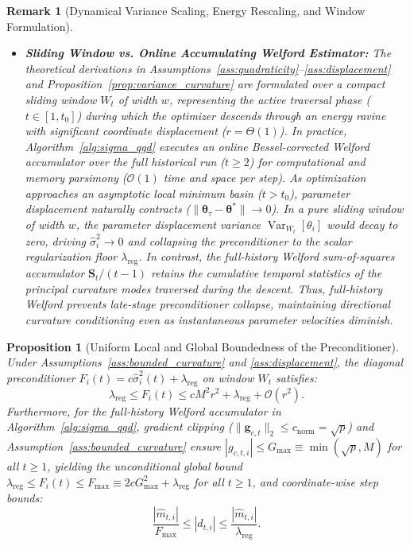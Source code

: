 \documentclass[11pt,a4paper]{article}
\newtheorem{proposition}{Proposition}
\newtheorem{remark}{Remark}
\begin{document}
\begin{remark}[Dynamical Variance Scaling, Energy Rescaling, and Window Formulation]
\begin{itemize}
    \item \textbf{Sliding Window vs. Online Accumulating Welford Estimator:} The theoretical derivations in Assumptions~\ref{ass:quadraticity}--\ref{ass:displacement} and Proposition~\ref{prop:variance_curvature} are formulated over a compact sliding window $W_t$ of width $w$, representing the active traversal phase ($t \in [1, t_0]$) during which the optimizer descends through an energy ravine with significant coordinate displacement ($r = \Theta(1)$). In practice, Algorithm~\ref{alg:sigma_qgd} executes an online Bessel-corrected Welford accumulator over the full historical run ($t \ge 2$) for computational and memory parsimony ($\mathcal{O}(1)$ time and space per step). As optimization approaches an asymptotic local minimum basin ($t > t_0$), parameter displacement naturally contracts ($\|\boldsymbol{\theta}_\tau - \boldsymbol{\theta}^*\| \to 0$). In a pure sliding window of width $w$, the parameter displacement variance $\operatorname{Var}_{W_t}[\theta_i]$ would decay to zero, driving $\hat{\sigma}_i^2 \to 0$ and collapsing the preconditioner to the scalar regularization floor $\lambda_{\text{reg}}$. In contrast, the full-history Welford sum-of-squares accumulator $\mathbf{S}_t / (t-1)$ retains the cumulative temporal statistics of the principal curvature modes traversed during the descent. Thus, full-history Welford prevents late-stage preconditioner collapse, maintaining directional curvature conditioning even as instantaneous parameter velocities diminish.
\end{itemize}
\end{remark}

\begin{proposition}[Uniform Local and Global Boundedness of the Preconditioner]
\label{prop:boundedness}
Under Assumptions~\ref{ass:bounded_curvature} and \ref{ass:displacement}, the diagonal preconditioner $F_i(t) = c \hat{\sigma}_i^2(t) + \lambda_{\text{reg}}$ on window $W_t$ satisfies:
\begin{equation}
\lambda_{\text{reg}} \le F_i(t) \le c M^2 r^2 + \lambda_{\text{reg}} + \mathcal{O}(r^2).
\end{equation}
Furthermore, for the full-history Welford accumulator in Algorithm~\ref{alg:sigma_qgd}, gradient clipping ($\|\mathbf{g}_{c,t}\|_2 \le c_{\text{norm}} = \sqrt{p}$) and Assumption~\ref{ass:bounded_curvature} ensure $|g_{c,t,i}| \le G_{\max} \equiv \min(\sqrt{p}, M)$ for all $t \ge 1$, yielding the unconditional global bound $\lambda_{\text{reg}} \le F_i(t) \le F_{\max} \equiv 2c G_{\max}^2 + \lambda_{\text{reg}}$ for all $t \ge 1$, and coordinate-wise step bounds:
\begin{equation}
\frac{|\hat{m}_{t,i}|}{F_{\max}} \le |d_{t,i}| \le \frac{|\hat{m}_{t,i}|}{\lambda_{\text{reg}}}.
\end{equation}
\end{proposition}
\end{document}
